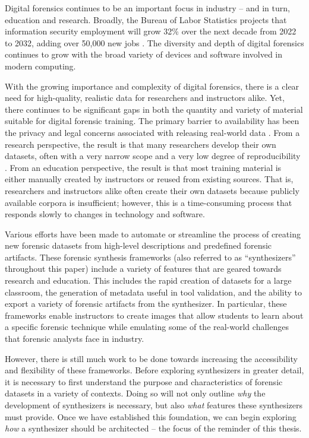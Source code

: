 Digital forensics continues to be an important focus in industry -- and
in turn, education and research. Broadly, the Bureau of Labor Statistics
projects that information security employment will grow 32\% over the
next decade from 2022 to 2032, adding over 50,000 new jobs
\cite{bureauoflaborstatisticsu.s.departmentoflaborInformationSecurityAnalysts2023}.
The diversity and depth of digital forensics continues to grow with the
broad variety of devices and software involved in modern computing.

With the growing importance and complexity of digital forensics, there
is a clear need for high-quality, realistic data for researchers and
instructors alike. Yet, there continues to be significant gaps in both
the quantity and variety of material suitable for digital forensic
training. The primary barrier to availability has been the privacy and
legal concerns associated with releasing real-world data
\cite{garfinkelForensicCorporaChallenge2007}. From a research
perspective, the result is that many researchers develop their own
datasets, often with a very narrow scope and a very low degree of
reproducibility
\cite{garfinkelBringingScienceDigital2009,grajedaAvailabilityDatasetsDigital2017}.
From an education perspective, the result is that most training material
is either manually created by instructors or reused from existing
sources. That is, researchers and instructors alike often create their
own datasets because publicly available corpora is insufficient;
however, this is a time-consuming process that responds slowly to
changes in technology and software.

Various efforts have been made to automate or streamline the process of
creating new forensic datasets from high-level descriptions and
predefined forensic artifacts. These forensic synthesis frameworks (also
referred to as ``synthesizers'' throughout this paper) include a variety
of features that are geared towards research and education. This
includes the rapid creation of datasets for a large classroom, the
generation of metadata useful in tool validation, and the ability to
export a variety of forensic artifacts from the synthesizer. In
particular, these frameworks enable instructors to create images that
allow students to learn about a specific forensic technique while
emulating some of the real-world challenges that forensic analysts face
in industry.

However, there is still much work to be done towards increasing the
accessibility and flexibility of these frameworks. Before exploring
synthesizers in greater detail, it is necessary to first understand the
purpose and characteristics of forensic datasets in a variety of
contexts. Doing so will not only outline \emph{why} the development of
synthesizers is necessary, but also \emph{what} features these
synthesizers must provide. Once we have established this foundation, we
can begin exploring \emph{how} a synthesizer should be architected --
the focus of the reminder of this thesis.

